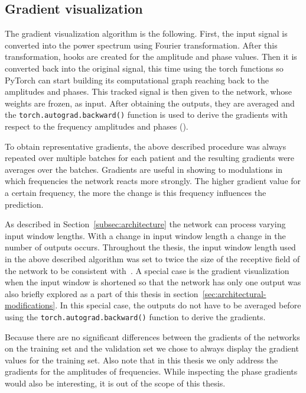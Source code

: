 \subsection{Gradient visualization}\label{subsec:gradinet-visualization}
The gradient visualization algorithm is the following.
First, the input signal is converted into the power spectrum using Fourier transformation.
After this transformation, hooks are created for the amplitude and phase values.
Then it is converted back into the original signal, this time using the torch functions so PyTorch can start building its computational graph reaching back to the amplitudes and phases.
This tracked signal is then given to the network, whose weights are frozen, as input.
After obtaining the outputs, they are averaged and the \texttt{torch.autograd.backward()} function is used to derive the gradients with respect to the frequency amplitudes and phases (\cite{gradient-visualization}).

To obtain representative gradients, the above described procedure was always repeated over multiple batches for each patient and the resulting gradients were averages over the batches.
Gradients are useful in showing to modulations in which frequencies the network reacts more strongly.
The higher gradient value for a certain frequency, the more the change is this frequency influences the prediction.

As described in Section~\ref{subsec:architecture} the network can process varying input window lengths. With a change in input window length a change in the number of outputs occurs.
Throughout the thesis, the input window length used in the above described algorithm was set to twice the size of the receptive field of the network to be consistent with~\cite{Hammer-2021}.
A special case is the gradient visualization when the input window is shortened so that the network has only one output was also briefly explored as a part of this thesis in section~\ref{sec:architectural-modifications}.
In this special case, the outputs do not have to be averaged before using the \texttt{torch.autograd.backward()} function to derive the gradients. 
 
Because there are no significant differences between the gradients of the networks on the training set and the validation set we chose to always display the gradient values for the training set.
Also note that in this thesis we only address the gradients for the amplitudes of frequencies.
While inspecting the phase gradients would also be interesting, it is out of the scope of this thesis.

